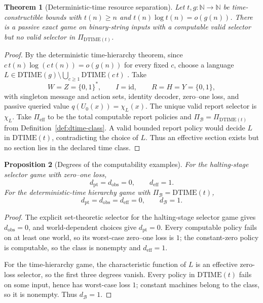 \documentclass[11pt]{article}
\theoremstyle{plain}
\newtheorem{theorem}{Theorem}[section]
\newtheorem{proposition}[theorem]{Proposition}
\theoremstyle{definition}
\theoremstyle{remark}
\newcommand{\N}{\mathbb{N}}
\begin{document}
\begin{theorem}[Deterministic-time resource separation]\label{thm:timeR}
Let $t,g:\N\to\N$ be time-constructible bounds with $t(n)\ge n$ and
$t(n)\log t(n)=o(g(n))$. There is a passive exact game on binary-string inputs
with a computable valid selector but no valid selector in
$\Pi_{\mathrm{DTIME}(t)}$.
\end{theorem}

\begin{proof}
By the deterministic time-hierarchy theorem, since
$c\,t(n)\log(c\,t(n))=o(g(n))$ for every fixed $c$, choose a language
$L\in\mathrm{DTIME}(g)\setminus\bigcup_{c\ge1}\mathrm{DTIME}(c\,t)$
\cite{arorabarak}. Take
\[
W=Z=\{0,1\}^*,\qquad I=\mathrm{id},\qquad
R=H=Y=\{0,1\},
\]
with singleton message and action sets, identity decoder, zero--one loss, and
passive queried value $q(U_0(x))=\chi_L(x)$. The unique valid report selector is
$\chi_L$. Take $\Pi_{\mathrm{eff}}$ to be the total computable report policies
and $\Pi_{\mathcal B}=\Pi_{\mathrm{DTIME}(t)}$ from
Definition~\ref{def:dtime-class}. A valid bounded report policy would decide
$L$ in $\mathrm{DTIME}(t)$, contradicting the choice of $L$. Thus an effective
section exists but no section lies in the declared time class.
\end{proof}

\begin{proposition}[Degrees of the computability examples]\label{prop:example-degrees}
For the halting-stage selector game with zero--one loss,
\[
d_{\mathrm{pt}}=d_{\mathrm{obs}}=0,
\qquad
d_{\mathrm{eff}}=1.
\]
For the deterministic-time hierarchy game with
$\Pi_{\mathcal B}=\mathrm{DTIME}(t)$,
\[
d_{\mathrm{pt}}=d_{\mathrm{obs}}=d_{\mathrm{eff}}=0,
\qquad d_{\mathcal B}=1.
\]
\end{proposition}

\begin{proof}
The explicit set-theoretic selector for the halting-stage selector game gives
$d_{\mathrm{obs}}=0$, and world-dependent choices give $d_{\mathrm{pt}}=0$.
Every computable policy fails on at least one world, so its worst-case zero--one
loss is $1$; the constant-zero policy is computable, so the class is nonempty and
$d_{\mathrm{eff}}=1$.

For the time-hierarchy game, the characteristic function of $L$ is an effective
zero-loss selector, so the first three degrees vanish. Every policy in
$\mathrm{DTIME}(t)$ fails on some input, hence has worst-case loss $1$; constant
machines belong to the class, so it is nonempty. Thus $d_{\mathcal B}=1$.
\end{proof}
\end{document}
